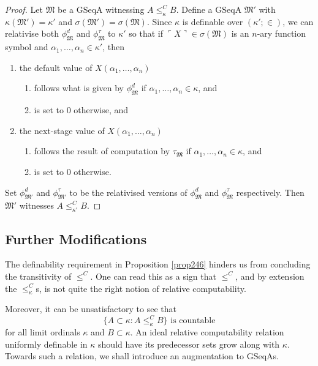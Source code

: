 \documentclass[12pt]{article}
\numberwithin{equation}{section}
\begin{document}
\begin{proof}
Let $\mathfrak{M}$ be a GSeqA witnessing $A \leq^C_{\kappa} B$. Define a GSeqA $\mathfrak{M}'$ with $\kappa(\mathfrak{M}') = \kappa'$ and $\sigma(\mathfrak{M}') = \sigma(\mathfrak{M})$. Since $\kappa$ is definable over $(\kappa'; \in)$, we can relativise both $\phi^d_{\mathfrak{M}}$ and $\phi^{\tau}_{\mathfrak{M}}$ to $\kappa'$ so that if $\ulcorner X \urcorner \in \sigma(\mathfrak{M})$ is an $n$-ary function symbol and $\alpha_1, \dots, \alpha_n \in \kappa'$, then 
\begin{enumerate}[label=(\arabic*)]
    \item the default value of $X(\alpha_1, \dots, \alpha_n)$
    \begin{enumerate}[label=(\alph*)]
        \item follows what is given by $\phi^d_{\mathfrak{M}}$ if $\alpha_1, \dots, \alpha_n \in \kappa$, and
        \item is set to $0$ otherwise, and
    \end{enumerate}
    \item the next-stage value of $X(\alpha_1, \dots, \alpha_n)$
    \begin{enumerate}[label=(\alph*)]
        \item follows the result of computation by $\tau_{\mathfrak{M}}$ if $\alpha_1, \dots, \alpha_n \in \kappa$, and
        \item is set to $0$ otherwise.
    \end{enumerate}
\end{enumerate} 
Set $\phi^d_{\mathfrak{M}'}$ and $\phi^{\tau}_{\mathfrak{M}'}$ to be the relativised versions of $\phi^d_{\mathfrak{M}}$ and $\phi^{\tau}_{\mathfrak{M}}$ respectively. Then $\mathfrak{M}'$ witnesses $A \leq^C_{\kappa'} B$.
\end{proof}

\subsection{Further Modifications}\label{ss320}

The definability requirement in Proposition \ref{prop246} hinders us from concluding the transitivity of $\leq^C$. One can read this as a sign that $\leq^C$, and by extension the $\leq^C_{\kappa}$s, is not quite the right notion of relative computability.

Moreover, it can be unsatisfactory to see that
\begin{equation*}
    \{A \subset \kappa : A \leq^C_{\kappa} B\} \text{ is countable}
\end{equation*}
for all limit ordinals $\kappa$ and $B \subset \kappa$. An ideal relative computability relation uniformly definable in $\kappa$ should have its predecessor sets grow along with $\kappa$. Towards such a relation, we shall introduce an augmentation to GSeqAs.
\end{document}
